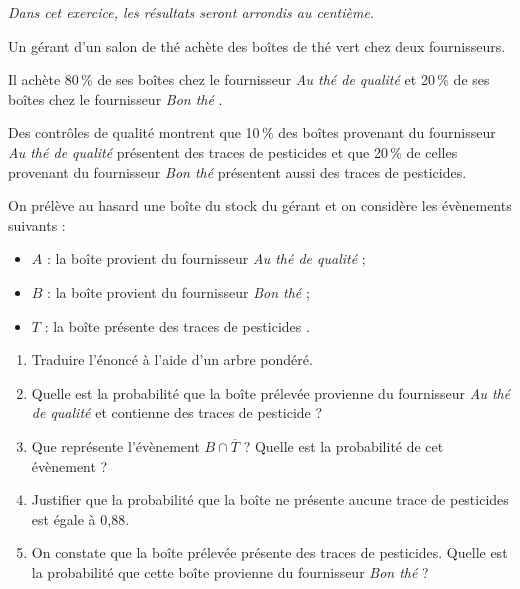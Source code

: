 \medskip

\emph{Dans cet exercice, les résultats seront arrondis au centième.}

\bigskip

Un gérant d'un salon de thé achète des boîtes de thé vert chez deux fournisseurs.

Il achète 80\,\% de ses boîtes chez le fournisseur \og{} \emph{Au thé de qualité} \fg{} et 20\,\% de ses boîtes chez le fournisseur \og{}\emph{Bon thé} \fg.

Des contrôles de qualité montrent que 10\,\% des boîtes provenant du fournisseur \og{} \emph{Au thé de qualité} \fg{} présentent des traces de pesticides et que 20\,\% de celles provenant du fournisseur \og{} \emph{Bon thé} \fg{} présentent aussi des traces de pesticides.

On prélève au hasard une boîte du stock du gérant et on considère les évènements suivants :
\begin{itemize}
\item $A$ : \og la boîte provient du fournisseur \og\emph{Au thé de qualité} \fg{}  ;
\item $B$ : \og la boîte provient du fournisseur \og \emph{Bon thé} \fg{}  ;
\item $T$ : \og la boîte présente des traces de pesticides \fg.
\end{itemize}

\medskip

\begin{enumerate}
\item Traduire l'énoncé à l'aide d'un arbre pondéré.
\item Quelle est la probabilité que la boîte prélevée provienne du fournisseur \og{} \emph{Au thé de qualité} \fg{} et contienne des traces de pesticide ?
\item Que représente l'évènement $B\cap\overline{T}$ ? Quelle est la probabilité de cet évènement ?
\item Justifier que la probabilité que la boîte ne présente aucune trace de pesticides est égale à 0,88.
\item On constate que la boîte prélevée présente des traces de pesticides. Quelle est la probabilité que cette boîte provienne du fournisseur \og \emph{Bon thé} \fg{} ?
\end{enumerate}

\vspace{0,5cm}
